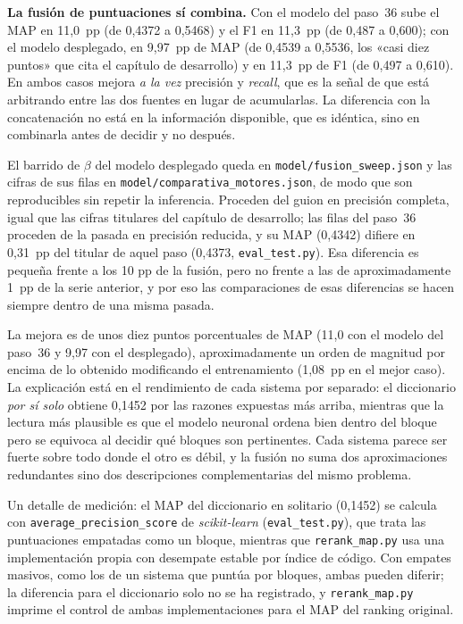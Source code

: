 \textbf{La fusión de puntuaciones sí combina.} Con el modelo del paso~36 sube el MAP en 11{,}0~pp (de 0{,}4372 a 0{,}5468) y el F1 en 11{,}3~pp (de 0{,}487 a 0{,}600); con el modelo desplegado, en 9{,}97~pp de MAP (de 0{,}4539 a 0{,}5536, los «casi diez puntos» que cita el capítulo de desarrollo) y en 11{,}3~pp de F1 (de 0{,}497 a 0{,}610). En ambos casos mejora \emph{a la vez} precisión y \emph{recall}, que es la señal de que está arbitrando entre las dos fuentes en lugar de acumularlas. La diferencia con la concatenación no está en la información disponible, que es idéntica, sino en combinarla antes de decidir y no después.

El barrido de $\beta$ del modelo desplegado queda en \texttt{model/\allowbreak fusion\_sweep.json} y las cifras de sus filas en \texttt{model/\allowbreak comparativa\_motores.json}, de modo que son reproducibles sin repetir la inferencia. Proceden del guion en precisión completa, igual que las cifras titulares del capítulo de desarrollo; las filas del paso~36 proceden de la pasada en precisión reducida, y su MAP (0{,}4342) difiere en 0{,}31~pp del titular de aquel paso (0{,}4373, \texttt{eval\_test.py}). Esa diferencia es pequeña frente a los 10 pp de la fusión, pero no frente a las de aproximadamente 1~pp de la serie anterior, y por eso las comparaciones de esas diferencias se hacen siempre dentro de una misma pasada.

La mejora es de unos diez puntos porcentuales de MAP (11{,}0 con el modelo del paso~36 y 9{,}97 con el desplegado), aproximadamente un orden de magnitud por encima de lo obtenido modificando el entrenamiento (1{,}08~pp en el mejor caso). La explicación está en el rendimiento de cada sistema por separado: el diccionario \emph{por sí solo} obtiene 0{,}1452 por las razones expuestas más arriba, mientras que la lectura más plausible es que el modelo neuronal ordena bien dentro del bloque pero se equivoca al decidir qué bloques son pertinentes. Cada sistema parece ser fuerte sobre todo donde el otro es débil, y la fusión no suma dos aproximaciones redundantes sino dos descripciones complementarias del mismo problema.

Un detalle de medición: el MAP del diccionario en solitario (0{,}1452) se calcula con \texttt{average\_precision\_score} de \emph{scikit-learn} (\texttt{eval\_test.py}), que trata las puntuaciones empatadas como un bloque, mientras que \texttt{rerank\_map.py} usa una implementación propia con desempate estable por índice de código. Con empates masivos, como los de un sistema que puntúa por bloques, ambas pueden diferir; la diferencia para el diccionario solo no se ha registrado, y \texttt{rerank\_map.py} imprime el control de ambas implementaciones para el MAP del ranking original.

